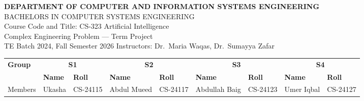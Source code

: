 \documentclass[11pt,a4paper]{article}
\begin{document}
\noindent
{\Large\bfseries DEPARTMENT OF COMPUTER AND INFORMATION SYSTEMS ENGINEERING}\\[2mm]
{\large BACHELORS IN COMPUTER SYSTEMS ENGINEERING}\\[1mm]
{\large Course Code and Title: CS-323 Artificial Intelligence}\\[1mm]
{\large Complex Engineering Problem --- Term Project}\\[1mm]
{\small TE Batch 2024, Fall Semester 2026 \quad Instructors: Dr.\ Maria Waqas, Dr.\ Sumayya Zafar}

\vspace{4mm}
\noindent
\setlength{\tabcolsep}{1.5pt}
\begin{tabular}{|p{1.2cm}|p{2.2cm}|p{1.4cm}|p{2.2cm}|p{1.4cm}|p{2.2cm}|p{1.4cm}|p{2.2cm}|p{1.4cm}|}
\hline
\bfseries Group & \multicolumn{2}{c|}{\bfseries S1}
                & \multicolumn{2}{c|}{\bfseries S2}
                & \multicolumn{2}{c|}{\bfseries S3}
                & \multicolumn{2}{c|}{\bfseries S4} \\
\cline{2-9}
                & \bfseries Name & \bfseries Roll
                & \bfseries Name & \bfseries Roll
                & \bfseries Name & \bfseries Roll
                & \bfseries Name & \bfseries Roll \\
\cline{2-9}
\footnotesize Members & Ukasha & CS-24115
        & Abdul Mueed & CS-24117
        & Abdullah Baig & CS-24123
        & Umer Iqbal & CS-24127 \\
\hline
\end{tabular}
\end{document}
